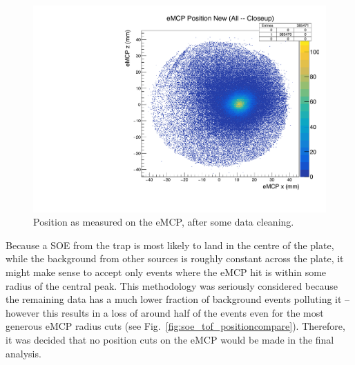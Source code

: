 \begin{figure}[h!!!!t!]
	\centering
	\includegraphics[width=.999\linewidth]
	{Figures/eMCP_position.pdf}
	\caption{Position as measured on the eMCP, after some data cleaning.}	
	\label{fig:emcp_position}
\end{figure}

Because a SOE from the trap is most likely to land in the centre of the plate, while the background from other sources is roughly constant across the plate,  it might make sense to accept only events where the eMCP hit is within some radius of the central peak.  This methodology was seriously considered because the remaining data has a much lower fraction of background events polluting it -- however this results in a loss of around half of the events even for the most generous eMCP radius cuts (see Fig.~\ref{fig:soe_tof_positioncompare}).  Therefore, it was decided that no position cuts on the eMCP would be made in the final analysis.

